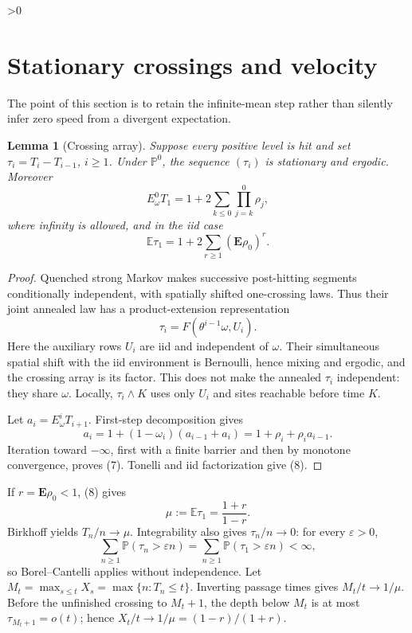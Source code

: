 \documentclass[10pt]{article}
\providecommand{\CRevisionRound}{2}
\newtheorem{lemma}{Lemma}
\theoremstyle{remark}
\newcommand{\EE}{\mathbf E}
\newcommand{\PA}{\mathbb P}
\begin{document}
\ifnum\CRevisionRound>0
\section{Stationary crossings and velocity}

The point of this section is to retain the infinite-mean step rather than
silently infer zero speed from a divergent expectation.

\begin{lemma}[Crossing array]\label{lem:crossing}
Suppose every positive level is hit and set
\(\tau_i=T_i-T_{i-1}\), \(i\geq1\).  Under \(\PA^0\), the sequence
\((\tau_i)\) is stationary and ergodic.  Moreover
\[
E_\omega^0T_1=1+2\sum_{k\leq0}\prod_{j=k}^{0}\rho_j,         \tag{7}
\]
where infinity is allowed, and in the iid case
\[
\mathbb E\tau_1=1+2\sum_{r\geq1}(\EE\rho_0)^r.              \tag{8}
\]
\end{lemma}

\begin{proof}
Quenched strong Markov makes successive post-hitting segments conditionally
independent, with spatially shifted one-crossing laws.  Thus their joint
annealed law has a product-extension representation
\[
\tau_i=F(\theta^{i-1}\omega,U_i).
\]
Here the auxiliary rows \(U_i\) are iid and independent of \(\omega\).  Their
simultaneous spatial shift with the iid environment is Bernoulli, hence mixing
and ergodic, and the crossing array is its factor.  This does not make the
annealed \(\tau_i\) independent: they share \(\omega\).  Locally,
\(\tau_i\wedge K\) uses only \(U_i\) and sites reachable before time \(K\).

Let \(a_i=E_\omega^iT_{i+1}\).  First-step decomposition gives
\[
a_i=1+(1-\omega_i)(a_{i-1}+a_i)
    =1+\rho_i+\rho_i a_{i-1}.
\]
Iteration toward \(-\infty\), first with a finite barrier and then by
monotone convergence, proves (7).  Tonelli and iid factorization give (8).
\end{proof}

If \(r=\EE\rho_0<1\), (8) gives
\[
\mu:=\mathbb E\tau_1=\frac{1+r}{1-r}.                       \tag{9}
\]
Birkhoff yields \(T_n/n\to\mu\).  Integrability also gives
\(\tau_n/n\to0\): for every \(\varepsilon>0\),
\[
\sum_{n\geq1}\PA(\tau_n>\varepsilon n)
=\sum_{n\geq1}\PA(\tau_1>\varepsilon n)<\infty,            \tag{10}
\]
so Borel--Cantelli applies without independence.  Let
\(M_t=\max_{s\leq t}X_s=\max\{n:T_n\leq t\}\).  Inverting passage times
gives \(M_t/t\to1/\mu\).  Before the unfinished crossing to \(M_t+1\), the
depth below \(M_t\) is at most \(\tau_{M_t+1}=o(t)\); hence
\(X_t/t\to1/\mu=(1-r)/(1+r)\).
\end{document}
